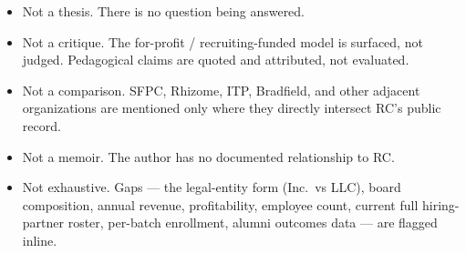 \documentclass[10pt,letterpaper,twocolumn]{article}
\begin{document}
\begin{itemize}
\item Not a thesis. There is no question being answered.
\item Not a critique. The for-profit / recruiting-funded model is surfaced, not judged. Pedagogical claims are quoted and attributed, not evaluated.
\item Not a comparison. SFPC, Rhizome, ITP, Bradfield, and other adjacent organizations are mentioned only where they directly intersect RC's public record.
\item Not a memoir. The author has no documented relationship to RC.
\item Not exhaustive. Gaps --- the legal-entity form (Inc.\ vs LLC), board composition, annual revenue, profitability, employee count, current full hiring-partner roster, per-batch enrollment, alumni outcomes data --- are flagged inline.
\end{itemize}



\end{document}

